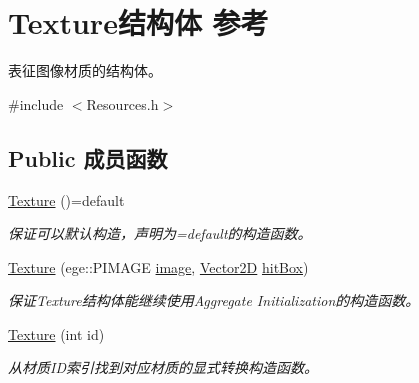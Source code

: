 \hypertarget{struct_texture}{}\section{Texture结构体 参考}
\label{struct_texture}


表征图像材质的结构体。  




{\ttfamily \#include $<$Resources.\+h$>$}

\subsection*{Public 成员函数}
\begin{DoxyCompactItemize}
\item 
\hyperlink{struct_texture_a66179be276016021e80b1c67c047d4ad}{Texture} ()=default
\begin{DoxyCompactList}\small\item\em 保证可以默认构造，声明为=default的构造函数。 \end{DoxyCompactList}\item 
\hyperlink{struct_texture_af59bcad788f8cdb48b1690e0ab31e095}{Texture} (ege\+::\+P\+I\+M\+A\+GE \hyperlink{struct_texture_ac4b0ce38664ca13285a077c12277e753}{image}, \hyperlink{structbasic__vector2_d}{Vector2D} \hyperlink{struct_texture_a1142de09bebe1683ee67c816953f9ad1}{hit\+Box})
\begin{DoxyCompactList}\small\item\em 保证\+Texture结构体能继续使用\+Aggregate Initialization的构造函数。 \end{DoxyCompactList}\item 
\hyperlink{struct_texture_a654c58271c71ff72ea2a417ea33e65d2}{Texture} (int id)
\begin{DoxyCompactList}\small\item\em 从材质\+I\+D索引找到对应材质的显式转换构造函数。 \end{DoxyCompactList}\end{DoxyCompactItemize}
